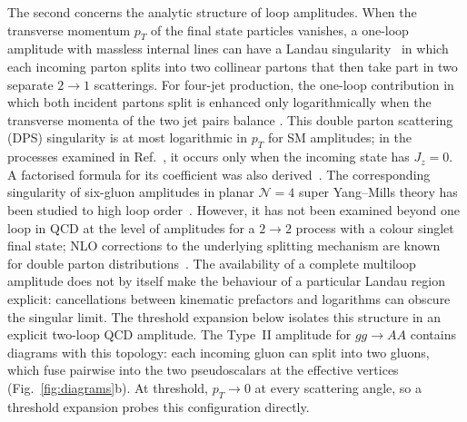 The second concerns the analytic structure of loop amplitudes. When the transverse momentum $p_T$ of the final state particles vanishes, a one-loop amplitude with massless internal lines can have a Landau singularity~\cite{Landau:1959fi} in which each incoming parton splits into two collinear partons that then take part in two separate $2\to1$ scatterings.
For four-jet production, the one-loop contribution in which both incident partons split is enhanced only logarithmically when the transverse momenta of the two jet pairs balance \cite{BDFS2011,BDFS2012}.
This double parton scattering (DPS) singularity is at most logarithmic in \(p_T\) for SM amplitudes; in the processes examined in Ref.~\cite{GauntStirling2011}, it occurs only when the incoming state has \(J_z=0\).
A factorised formula for its coefficient was also derived~\cite{GauntStirling2011}.
The corresponding singularity of six-gluon amplitudes in planar \(\mathcal N=4\) super Yang--Mills theory has been studied to high loop order~\cite{DixonEsterlis2016,DixonEsterlis2016Erratum}.
%
%
However, it has not been examined beyond one loop in QCD at the level of amplitudes for a $2\to2$ process with a colour singlet final state; NLO corrections to the underlying splitting mechanism are known~\cite{Diehl:2019rdh} for double parton distributions~\cite{DiehlOstermeierSchafer2012,DiehlOstermeierSchafer2012Erratum}. The availability of a complete multiloop amplitude does not by itself make the behaviour of a particular Landau region explicit: cancellations between kinematic prefactors and logarithms can obscure the singular limit. The threshold expansion below isolates this structure in an explicit two-loop QCD amplitude.
The Type~II amplitude for $gg\to AA$ contains diagrams with this
topology: each incoming gluon can split into two gluons, which
fuse pairwise into the two pseudoscalars at the effective vertices
(Fig.~\ref{fig:diagrams}b). At threshold, $p_T\to0$ at every
scattering angle, so a threshold expansion probes this
configuration directly.

